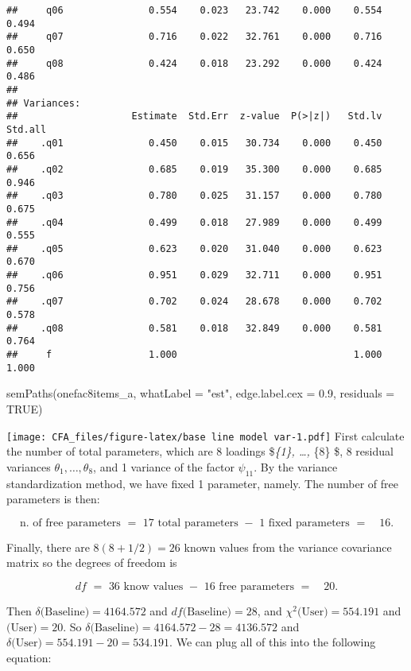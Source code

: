 \documentclass[
]{article}
\newenvironment{Shaded}{\begin{snugshade}}{\end{snugshade}}
\newcommand{\AttributeTok}[1]{\textcolor[rgb]{0.77,0.63,0.00}{#1}}
\newcommand{\ConstantTok}[1]{\textcolor[rgb]{0.00,0.00,0.00}{#1}}
\newcommand{\FloatTok}[1]{\textcolor[rgb]{0.00,0.00,0.81}{#1}}
\newcommand{\FunctionTok}[1]{\textcolor[rgb]{0.00,0.00,0.00}{#1}}
\newcommand{\NormalTok}[1]{#1}
\newcommand{\StringTok}[1]{\textcolor[rgb]{0.31,0.60,0.02}{#1}}
\begin{document}
\begin{verbatim}
##     q06               0.554    0.023   23.742    0.000    0.554    0.494
##     q07               0.716    0.022   32.761    0.000    0.716    0.650
##     q08               0.424    0.018   23.292    0.000    0.424    0.486
## 
## Variances:
##                    Estimate  Std.Err  z-value  P(>|z|)   Std.lv  Std.all
##    .q01               0.450    0.015   30.734    0.000    0.450    0.656
##    .q02               0.685    0.019   35.300    0.000    0.685    0.946
##    .q03               0.780    0.025   31.157    0.000    0.780    0.675
##    .q04               0.499    0.018   27.989    0.000    0.499    0.555
##    .q05               0.623    0.020   31.040    0.000    0.623    0.670
##    .q06               0.951    0.029   32.711    0.000    0.951    0.756
##    .q07               0.702    0.024   28.678    0.000    0.702    0.578
##    .q08               0.581    0.018   32.849    0.000    0.581    0.764
##     f                 1.000                               1.000    1.000
\end{verbatim}

\begin{Shaded}
\begin{Highlighting}[]
\FunctionTok{semPaths}\NormalTok{(onefac8items\_a, }\AttributeTok{whatLabel =} \StringTok{"est"}\NormalTok{, }\AttributeTok{edge.label.cex =} \FloatTok{0.9}\NormalTok{, }\AttributeTok{residuals =} \ConstantTok{TRUE}\NormalTok{) }
\end{Highlighting}
\end{Shaded}

\texttt{[image: CFA\_files/figure-latex/base line model var-1.pdf]} First
calculate the number of total parameters, which are 8 loadings
\$\lambda\emph{\{1\}, \ldots, \lambda}\{8\} \$, 8 residual variances
\(\theta_{1},\ldots,\theta_{8}\), and 1 variance of the factor
\(\psi_{11}\). By the variance standardization method, we have fixed 1
parameter, namely. The number of free parameters is then:

\[\text{n. of free parameters}\,\,=\,\,17 \,\,\text{total parameters}\,\, - \,\, 1 \,\, \text{fixed parameters}\,\, = \quad 16.\]

Finally, there are \(8(8+1/2)=26\) known values from the variance
covariance matrix so the degrees of freedom is

\[df\,\,=\,\,36 \,\,\text{know values}\,\, - \,\, 16 \,\, \text{free parameters}\,\, = \quad 20.\]

Then \(\delta \text{(Baseline)}=4164.572\) and
\(df\text{(Baseline)}=28\), and \(\chi^{2}\text{(User)}=554.191\) and
\(\text{(User)}=20\). So
\(\delta \text{(Baseline)}=4164.572-28=4136.572\) and
\(\delta \text{(User)}=554.191-20=534.191\). We can plug all of this
into the following equation:
\end{document}
